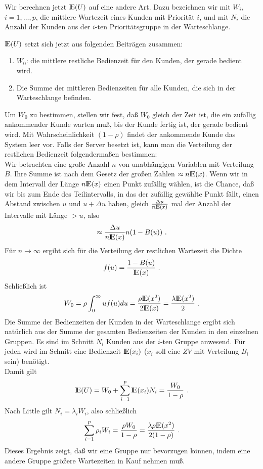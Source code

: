 Wir berechnen jetzt ${\rm I\kern-0.2em E}(U)$ auf eine andere Art. Dazu bezeichnen wir mit $W_{i}$, $i=1, \dots , p$, die mittlere Wartezeit eines Kunden mit Priorität $i$, und
mit
$N_{i}$ die Anzahl der Kunden aus der $i$-ten Prioritätsgruppe in der Warteschlange.

${\rm I\kern-0.2em E}(U)$ setzt sich jetzt aus folgenden Beiträgen zusammen:
\begin{enumerate}
\item $W_{0}$: die mittlere restliche Bedienzeit für den Kunden, der gerade bedient wird.
\item Die Summe der mittleren Bedienzeiten für alle Kunden, die sich in der Warteschlange befinden.
\end{enumerate}
Um $W_{0}$ zu bestimmen, stellen wir fest, daß $W_{0}$ gleich der Zeit ist, die ein zufällig ankommender Kunde warten muß, bis der Kunde fertig ist, der gerade
bedient wird. Mit Wahrscheinlichkeit $(1-\rho)$ findet der ankommende Kunde das System leer vor. Falls der Server besetzt ist, kann man die Verteilung der
restlichen Bedienzeit folgendermaßen bestimmen: \\
Wir betrachten eine große Anzahl $n$ von unabhängigen Variablen mit Verteilung $B$. Ihre Summe ist nach dem Gesetz der großen Zahlen $\approx n{\rm I\kern-0.2em E}(x)$. Wenn wir
in dem Intervall der Länge $n{\rm I\kern-0.2em E}(x)$ einen Punkt zufällig wählen, ist die Chance, daß wir bis zum Ende des Teilintervalls, in das der zufällig gewählte Punkt
fällt, einen Abstand zwischen $u$ und $u+\Delta u$ haben, gleich $\frac{\Delta u}{n{\rm I\kern-0.2em E}(x)}$ mal der Anzahl der Intervalle mit Länge $> u$, also
\[  \approx \frac{\Delta u}{n{\rm I\kern-0.2em E}(x)}n(1-B(u)) ~.  \]
 Für $n \rightarrow \infty$ ergibt sich für die Verteilung der restlichen Wartezeit die Dichte
\[f(u)=\frac{1-B(u)}{{\rm I\kern-0.2em E}(x)} ~. \]
Schließlich ist
\[W_{0}=\rho \int_{0}^{\infty}uf(u)du = \frac{\rho {\rm I\kern-0.2em E}(x^{2})}{2{\rm I\kern-0.2em E}(x)}=\frac{\lambda {\rm I\kern-0.2em E}(x^{2})}{2} ~. \]
Die Summe der Bedienzeiten der Kunden in der Warteschlange ergibt sich natürlich aus der Summe der gesamten Bedienzeiten der Kunden in den einzelnen Gruppen.
Es sind im Schnitt $N_{i}$ Kunden aus der $i$-ten Gruppe anwesend. Für jeden wird im Schnitt eine Bedienzeit ${\rm I\kern-0.2em E}(x_{i})$ ($x_{i}$ soll eine $ZV$ mit Verteilung
$B_{i}$ sein) benötigt. \\
Damit gilt
\[{\rm I\kern-0.2em E}(U)=W_{0}+\sum_{i=1}^{p}{\rm I\kern-0.2em E}(x_{i})N_{i}=\frac{W_{0}}{1-\rho} ~. \]
Nach Little gilt $N_{i}=\lambda_{i}W_{i}$, also schließlich
\[ \sum_{i=1}^{p}\rho_{i}W_{i}=\frac{\rho W_{0}}{1-\rho}=\frac{\lambda \rho {\rm I\kern-0.2em E}(x^{2})}{2(1-\rho)} ~.\]
Dieses Ergebnis zeigt, daß wir eine Gruppe nur bevorzugen können, indem eine andere Gruppe größere Wartezeiten in Kauf nehmen muß.

